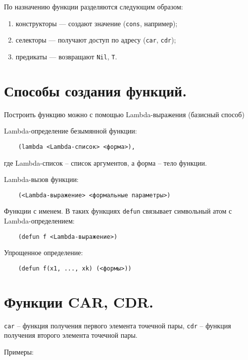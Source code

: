 По назначению функции разделяются следующим образом:

\begin{enumerate}
    \item конструкторы --- создают значение (\texttt{cons}, например);
    \item селекторы --- получают доступ по адресу (\texttt{car}, \texttt{cdr});
    \item предикаты --- возвращают \texttt{Nil}, \texttt{T}.
\end{enumerate}

\section{Способы создания функций.}

Построить функцию можно с помощью Lambda-выражения (базисный способ)

Lambda-определение безымянной функции:

\begin{lstlisting}
	(lambda <Lambda-список> <форма>),
\end{lstlisting}

где Lambda-список -- список аргументов, а форма -- тело функции.

Lambda-вызов функции:

\begin{lstlisting}
	(<Lambda-выражение> <формальные параметры>)
\end{lstlisting}

Функции с именем. В таких функциях \texttt{defun} связывает символьный атом с Lambda-определением:

\begin{lstlisting}
	(defun f <Lambda-выражение>)
\end{lstlisting}

Упрощенное определение:

\begin{lstlisting}
	(defun f(x1, ..., xk) (<формы>))
\end{lstlisting}


\section{Функции CAR, CDR.}

\texttt{car} -- функция получения первого элемента точечной пары, \texttt{cdr} -- функция получения второго элемента точечной пары.

Примеры:

